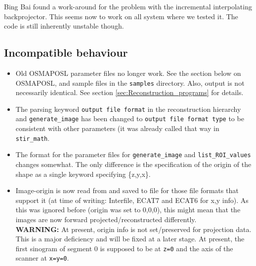 \documentclass{article}
\begin{document}
Bing Bai found a work-around for the problem with the incremental interpolating backprojector.
This seems now to work on all system where we tested it. The code is still inherently unstable 
though.

\subsection{Incompatible behaviour}
\begin{itemize}
\item Old OSMAPOSL parameter files no longer work. See the section below on OSMAPOSL,
   and sample files in the \texttt{samples} directory. Also, output is not necessarily
   identical. See section \ref{sec:Reconstruction_programs} for details.
\item The parsing keyword \texttt{output file format} in the reconstruction hierarchy
and \texttt{generate\_image} has been changed to \texttt{output file format type} to
be consistent with other parameters (it was already called that way in \texttt{stir\_math}.
\item The format for the parameter files for \texttt{generate\_image} and
   \texttt{list\_ROI\_values} changes somewhat. The only difference is the
   specification of the origin of the shape as a single keyword specifying \{z,y,x\}.
\item Image-origin is now read from and saved to file for those file formats that
    support it (at time of writing: Interfile, ECAT7 and ECAT6 for x,y info).
    As this was ignored before (origin was set to 0,0,0), this might mean that 
    the images are now forward projected/reconstructed differently.\\
    \textbf{WARNING:} At present, origin info is not set/preserved for
    projection data. This is a major deficiency and will be fixed at a later stage.
   At present, the first sinogram of segment 0 is supposed to be at \texttt{z=0} and
   the axis of the scanner at \texttt{x=y=0}.
\end{itemize}
\end{document}
